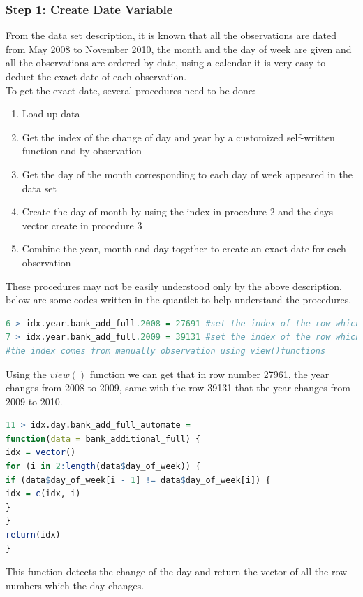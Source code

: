 \documentclass[12pt, a4paper, bibliography=totoc, english]{scrartcl}
\begin{document}
\subsubsection{Step 1: Create Date Variable}
From the data set description, it is known that all the observations are dated from May 2008 to November 2010, the month and the day of week are given and all the observations are ordered by date, using a calendar it is very easy to deduct the exact date of each observation.\\
To get the exact date, several procedures need to be done:\\
\begin{enumerate}
	\item Load up data
	\item Get the index of the change of day and year by a customized self-written function and by observation
	\item Get the day of the month corresponding to each day of week appeared in the data set
	\item Create the day of month by using the index in procedure 2 and the days vector create in procedure 3
	\item Combine the year, month and day together to create an exact date for each observation
\end{enumerate}
These procedures may not be easily understood only by the above description, below are some codes written in the quantlet to help understand the procedures.
\begin{lstlisting}[language = R]
6 > idx.year.bank_add_full.2008 = 27691 #set the index of the row which the year changed from 2008 to 2009
7 > idx.year.bank_add_full.2009 = 39131 #set the index of the row which the year changed from 2009 to 2010
#the index comes from manually observation using view()functions
\end{lstlisting}
Using the $view()$ function we can get that in row number 27961, the year changes from 2008 to 2009, same with the row 39131 that the year changes from 2009 to 2010.
\begin{lstlisting}[language = R]
11 > idx.day.bank_add_full_automate =
function(data = bank_additional_full) {
idx = vector()
for (i in 2:length(data$day_of_week)) {
if (data$day_of_week[i - 1] != data$day_of_week[i]) {
idx = c(idx, i)
}
}
return(idx)
}

\end{lstlisting}
This function detects the change of the day and return the vector of all the row numbers which the day changes.
\end{document}
